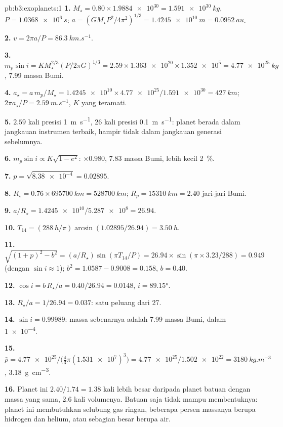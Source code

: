 \begin{solution}{pb:b3:exoplanets:1}
\textbf{1.} $M_\star = 0.80\times\num{1.9884e30} = \qty{1.591e30}{kg}$, $P =
\qty{1.0368e6}{s}$: $a = (GM_\star P^2/4\pi^2)^{1/3} = \qty{1.4245e10}{m}
= \qty{0.0952}{au}$.

\textbf{2.} $v = 2\pi a/P = \qty{86.3}{km.s^{-1}}$.

\textbf{3.} $m_p\sin i = KM_\star^{2/3}(P/2\pi G)^{1/3} = 2.59\times\num{1.363e20}
\times\num{1.352e5} = \qty{4.77e25}{kg}$, \num{7.99} massa Bumi.

\textbf{4.} $a_\star = a\,m_p/M_\star = \num{1.4245e10}\times\num{4.77e25}/
\num{1.591e30} = \qty{427}{km}$; $2\pi a_\star/P = \qty{2.59}{m.s^{-1}}$,
$K$ yang teramati.

\textbf{5.} $2.59$ kali presisi \qty{1}{m.s^{-1}}, 26 kali presisi
\qty{0.1}{m.s^{-1}}: planet berada dalam jangkauan instrumen terbaik,
hampir tidak dalam jangkauan generasi sebelumnya.

\textbf{6.} $m_p\sin i \propto K\sqrt{1 - e^2}$: $\times0.980$, 7.83 massa Bumi,
lebih kecil \qty{2}{\percent}.

\textbf{7.} $p = \sqrt{\num{8.38e-4}} = 0.02895$.

\textbf{8.} $R_\star = 0.76\times\qty{695700}{km} = \qty{528700}{km}$; $R_p =
\qty{15310}{km} = 2.40$ jari-jari Bumi.

\textbf{9.} $a/R_\star = \num{1.4245e10}/\num{5.287e8} = 26.94$.

\textbf{10.} $T_{14} = (\qty{288}{h}/\pi)\arcsin(1.02895/26.94) = \qty{3.50}{h}$.

\textbf{11.} $\sqrt{(1 + p)^2 - b^2} = (a/R_\star)\sin(\pi T_{14}/P) = 26.94\times
\sin(\pi\times3.23/288) = 0.949$ (dengan $\sin i \approx 1$); $b^2 =
1.0587 - 0.9008 = 0.158$, $b = 0.40$.

\textbf{12.} $\cos i = b\,R_\star/a = 0.40/26.94 = 0.0148$, $i = \ang{89.15}$.

\textbf{13.} $R_\star/a = 1/26.94 = 0.037$: satu peluang dari 27.

\textbf{14.} $\sin i = 0.99989$: massa sebenarnya adalah 7.99 massa Bumi,
 dalam \num{1e-4}.

\textbf{15.} $\bar\rho = \num{4.77e25}/\bigl(\tfrac43\pi(\num{1.531e7})^3\bigr) =
\num{4.77e25}/\num{1.502e22} = \qty{3180}{kg.m^{-3}}$,
\qty{3.18}{g.cm^{-3}}.

\textbf{16.} Planet ini $2.40/1.74 = 1.38$ kali lebih besar daripada planet batuan
dengan massa yang sama, 2.6 kali volumenya. Batuan saja tidak mampu membentuknya: planet ini membutuhkan
selubung gas ringan, beberapa persen massanya berupa hidrogen dan helium,
atau sebagian besar berupa air.


\end{solution}
